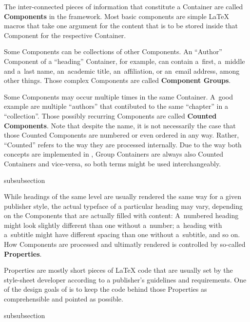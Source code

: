 The inter-connected pieces of information that constitute a Container
are called \textbf{Components} in the {\CoCoTeX} framework. Most basic
components are simple {\LaTeX} macros that take one argument for the
content that is to be stored inside that Component for the respective
Container.

Some Components can be collections of other Components. An “Author”
Component of a “heading” Container, for example, can contain a~first,
a~middle and a~last name, an~academic title, an~affiliation, or
an~email address, among other things. Those complex Components are
called \textbf{Component Groups}.

Some Components may occur multiple times in the same Container. A~good
example are multiple “authors” that contibuted to the same “chapter”
in a “collection”. Those possibly recurring Components are called
\textbf{Counted Components}. Note that
despite the name, it is not necessarily the case that those Counted
Components are numbered or even ordered in any way. Rather,
``Counted'' refers to the way they are processed internally. Due to
the way both concepts are implemented in {\CoCoTeX}, Group Containers
are always also Counted Containers and vice-versa, so both terms might
be used interchangeably.

\begin{heading}[label=sec:overview.properties]{subsubsection}
\end{heading}

While headings of the same level are usually rendered the same way for
a given publisher style, the actual typeface of a particular heading
may vary, depending on the Components that are actually filled with
content: A~numbered heading might look slightly different than one
without a~number; a~heading with a~subtitle might have different
spacing than one without a~subtitle, and so on. How Components are
processed and ultimatly rendered is controlled by so-called
\textbf{Properties}.

Properties are mostly short pieces of {\LaTeX} code that are usually
set by the style-sheet developer according to a publisher's guidelines
and requirements. One of the design goals of {\CoCoTeX} is to keep the
code behind those Properties as comprehensible and pointed as
possible.

\begin{heading}[label=sec:overview.types]{subsubsection}
\end{heading}


